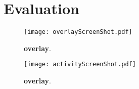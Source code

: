 \section{Evaluation}
\label{sec:eval}


\begin{figure}[t]
\centering
\texttt{[image: overlayScreenShot.pdf]}
\caption{\textbf{\name overlay}. }
\label{fig:screenshot_1}
\centering
\end{figure}




\begin{figure}[t]
\centering
\texttt{[image: activityScreenShot.pdf]}
\caption{\textbf{\name overlay}. }
\label{fig:screenshot_2}
\centering
\end{figure}
